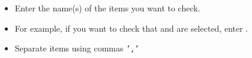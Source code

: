 \begin{itemize}
\item  Enter the name(s) of the items you want to check.
\item For example, if you want to check that  and   are selected, enter . 
\item Separate items using commas {\tt ','}
\end{itemize}

    